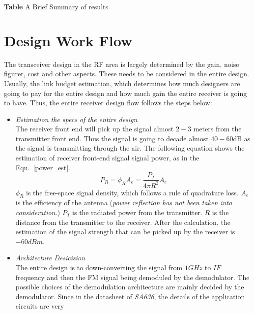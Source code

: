 \documentclass[]{article}
\begin{document}
\begin{center}
    \textbf{Table} A Brief Summary of results
\end{center}

\section{Design Work Flow}
The transceiver design in the RF area is largely determined by the gain, noise
figurer, cost and other aspects. These needs to be considered in the entire
design. Usually, the link budget estimation, which determines how much designers
are going to pay for the entire design and how much gain the entire receiver is
going to have.
Thus, the entire receiver design flow follows the steps below:
    \begin{itemize}
        \item \textit{Estimation the specs of the entire design} \\
            The receiver front end will pick up the signal almost $2-3$ meters
            from the transmitter front end. Thus the signal is going to decade
            almost $40-60$dB as the signal is transmitting through the air. The
            following equation shows the estimation of receiver front-end signal
            signal power, as in the Equ.~\ref{power_est}.
            \begin{equation}
                P_{R} = \phi_{R}A_{e}=\frac{P_{T}}{4\pi R^2}A_{e}
                \label{power_est}
            \end{equation}
            $\phi_{R}$ is the free-space signal density, which follows a rule of
            quadrature loss. $A_{e}$ is the efficiency of the antenna
            (\textit{power reflection has not been taken into consideration.})
            $P_{T}$ is the radiated power from the transmitter. $R$ is the
            distance from the transmitter to the receiver. After the
            calculation, the estimation of the signal strength that can be
            picked up by the receiver is $-60dBm$.
        \item \textit{Architecture Desicision} \\
            The entire design is to down-converting the signal from $1GHz$ to
            $IF$ frequency and then the FM signal being demoduled by the
            demodulator. The possible choices of the demodulation architecture
            are mainly decided by the demodulator. Since in the datasheet of
            \textit{SA636}, the details of the application circuits are very

\end{itemize}
\end{document}
